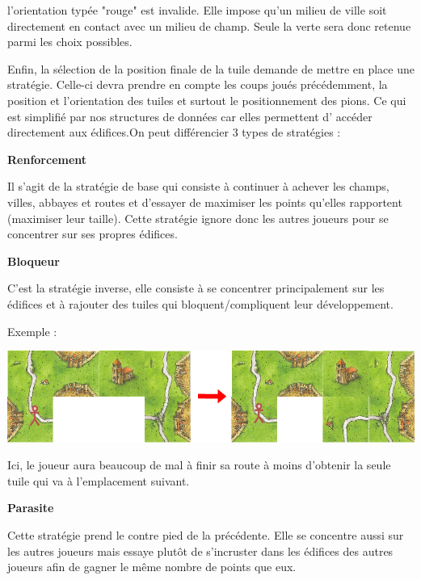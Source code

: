 \begin{minipage}{1\linewidth}
     l'orientation typée "rouge" est invalide. Elle impose qu'un milieu de ville soit directement en contact avec un milieu de champ. Seule la verte sera donc retenue parmi les choix possibles. 
\end{minipage}
\hspace{1cm}
\newline
Enfin, la sélection de la position finale de la tuile demande de mettre en place une stratégie. Celle-ci devra prendre en compte les coups joués précédemment, la position et l'orientation des tuiles et surtout le positionnement des pions. Ce qui est simplifié par nos structures de données car elles permettent d' accéder directement aux édifices.On peut différencier 3 types de stratégies  : 
    
    \vspace{0.5cm}
    
\textbf{Renforcement}

Il s'agit de la stratégie de base qui consiste à continuer à achever les champs, villes, abbayes et routes et d'essayer de maximiser les points qu'elles rapportent (maximiser leur taille). Cette stratégie ignore donc les autres joueurs pour se concentrer sur ses propres édifices.
\newline

 \textbf{Bloqueur}

C'est la stratégie inverse, elle consiste à se concentrer principalement sur les édifices et à rajouter des tuiles qui bloquent/compliquent leur développement.

Exemple :

\includegraphics[scale=0.5]{Bloquer.png}

 Ici, le joueur aura beaucoup de mal à finir sa route à moins d'obtenir la seule tuile qui va à l'emplacement suivant.
 
 \vspace{0.5cm}
 
 \textbf{Parasite}

Cette stratégie prend le contre pied de la précédente. Elle se concentre aussi sur les autres joueurs mais essaye plutôt de s'incruster dans les édifices des autres joueurs afin de gagner le même nombre de points que eux.

